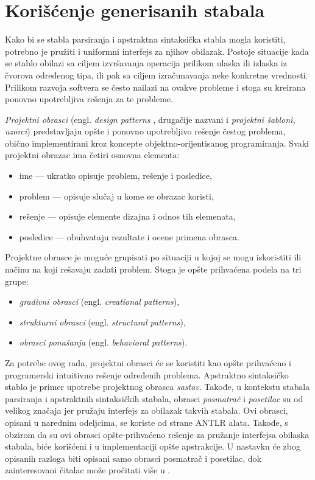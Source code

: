 \section{Korišćenje generisanih stabala}
\label{sec:DesignPatterns}

Kako bi se stabla parsiranja i apstraktna sintaksička stabla mogla koristiti, potrebno je pružiti i uniformni interfejs za njihov obilazak. Postoje situacije kada se stablo obilazi sa ciljem izvršavanja operacija prilikom ulaska ili izlaska iz čvorova određenog tipa, ili pak sa ciljem izračunavanja neke konkretne vrednosti. Prilikom razvoja softvera se često nailazi na ovakve probleme i stoga su kreirana ponovno upotrebljiva rešenja za te probleme. 

\emph{Projektni obrasci} (engl. \emph{design patterns} \cite{DesignPatternsBook}, drugačije nazvani i \emph{projektni šabloni, uzorci}) predstavljaju opšte i ponovno upotrebljivo rešenje čestog problema, obično implementirani kroz koncepte objektno-orijentisanog programiranja. Svaki projektni obrazac ima četiri osnovna elementa:
\begin{itemize}
    \item ime --- ukratko opisuje problem, rešenje i posledice,
    \item problem --- opisuje slučaj u kome se obrazac koristi,
    \item rešenje --- opisuje elemente dizajna i odnos tih elemenata,
    \item posledice --- obuhvataju rezultate i ocene primena obrasca.
\end{itemize}

Projektne obrasce je moguće grupisati po situaciji u kojoj se mogu iskoristiti ili načinu na koji rešavaju zadati problem. Stoga je opšte prihvaćena podela na tri grupe:
\begin{itemize}
    \item \emph{gradivni obrasci} (engl. \emph{creational patterns}),
    \item \emph{strukturni obrasci} (engl. \emph{structural patterns}),
    \item \emph{obrasci ponašanja} (engl. \emph{behavioral patterns}).
\end{itemize}

Za potrebe ovog rada, projektni obrasci će se koristiti kao opšte prihvaćeno i programerski intuitivno rešenje određenih problema. Apstraktno sintaksičko stablo je primer upotrebe projektnog obrasca \emph{sastav}. Takođe, u kontekstu stabala parsiranja i apstraktnih sintaksičkih stabala, obrasci \emph{posmatrač} i \emph{posetilac} su od velikog značaja jer pružaju interfejs za obilazak takvih stabala. Ovi obrasci, opisani u narednim odeljcima, se koriste od strane ANTLR alata. Takođe, s obzirom da su ovi obrasci opšte-prihvaćeno rešenje za pružanje interfejsa obilaska stabala, biće korišćeni i u implementaciji opšte apstrakcije. U nastavku će zbog opisanih razloga biti opisani samo obrasci posmatrač i posetilac, dok zainteresovani čitalac može pročitati više u \cite{DesignPatternsBook}.

